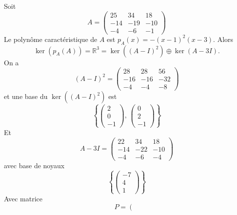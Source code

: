 \begin{example}
  \label{exe:47}
  Soit
  \begin{displaymath}
    A = \left(\begin{array}{rrr}
25 & 34 & 18 \\
-14 & -19 & -10 \\
-4 & -6 & -1
\end{array}\right)
\end{displaymath}
%
Le polynôme caractéristique de $A$ est $p_A(x) = -  (x-1)^2 (x-3)$. Alors
\begin{displaymath}
  \ker(p_A(A))  = ℝ^3 = \ker\left((A - I)^2\right) ⊕  \ker(A - 3I). 
\end{displaymath}
On a
\begin{displaymath}
(A - I)^2 =   \left(\begin{array}{rrr}
28 & 28 & 56 \\
-16 & -16 & -32 \\
-4 & -4 & -8
\end{array}\right)
\end{displaymath}
et une base du $\ker\left((A - I)^2\right)$ est
\begin{displaymath}
  \left\{
    \begin{pmatrix}
      2\\0\\-1
    \end{pmatrix}, \,
    \begin{pmatrix}
      0\\2\\ -1
    \end{pmatrix}
\right\} 
\end{displaymath}
Et
\begin{displaymath}
A - 3I =   \left(\begin{array}{rrr}
22 & 34 & 18 \\
-14 & -22 & -10 \\
-4 & -6 & -4
                 \end{array}\right)               
\end{displaymath}
avec base de noyaux
\begin{displaymath}
  \left\{
    \begin{pmatrix}
      -7 \\ 4 \\ 1
    \end{pmatrix} \right\} 
\end{displaymath}
Avec matrice
\begin{displaymath}
  P = \left(\begin{array}{rrr}

\end{array}
\end{displaymath}
\end{example}
